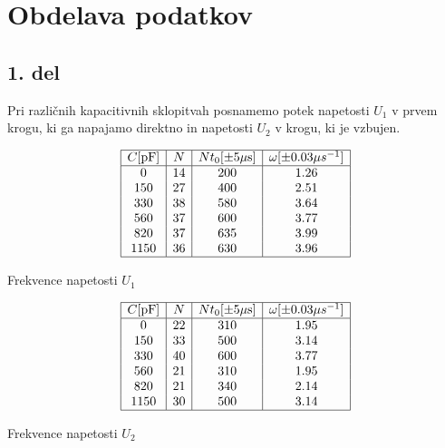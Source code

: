 \documentclass[12pt]{report}
\begin{document}
\endgroup


\chapter*{Obdelava podatkov}

\section*{1. del}

Pri različnih kapacitivnih sklopitvah posnamemo potek napetosti $U_1$ v prvem krogu, ki ga napajamo direktno in napetosti $U_2$ v krogu, ki je vzbujen. 

\begin{tabela}[H]
  \centering
  \[
    \begin{array}{|c|c|c|c|} \hline 
      C [\si{pF}] & N & Nt_0 [\pm 5 \si{\mu s}] & \omega [\pm 0.03 \mu s^{-1}]\\ \hline 
      0 & 14 & 200 & 1.26\\ 
      150 & 27 & 400 & 2.51\\
      330 & 38 & 580 & 3.64\\
      560 & 37 & 600 & 3.77\\
      820 & 37 & 635 & 3.99\\
      1150 & 36 & 630 & 3.96\\ \hline 
    \end{array}
  \]
  \caption{\small Frekvence napetosti $U_1$}
\end{tabela}

\begin{tabela}[H]
  \centering
  \[
    \begin{array}{|c|c|c|c|} \hline 
      C [\si{pF}] & N & Nt_0 [\pm 5 \si{\mu s}] & \omega [\pm 0.03 \mu s^{-1}]\\ \hline 
      0 & 22 & 310 & 1.95\\
      150 & 33 & 500 & 3.14\\
      330 & 40 & 600 & 3.77\\
      560 & 21 & 310 & 1.95\\
      820 & 21 & 340 & 2.14\\
      1150 & 30 & 500 & 3.14\\ \hline
    \end{array}
  \]
  \caption{\small Frekvence napetosti $U_2$}
\end{tabela}
\end{document}
